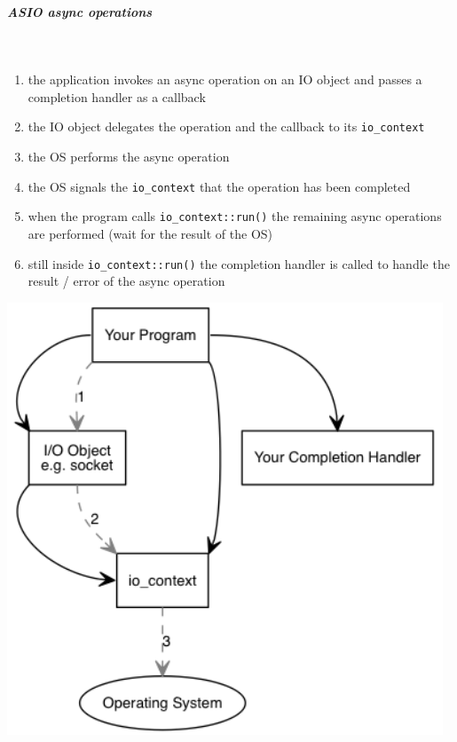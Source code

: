 \documentclass[11pt,twoside,landscape]{article}
\begin{document}
\begin{multicols}{2}
\subparagraph{ASIO async operations} \
\label{sec:org05bd540}
\begin{enumerate}
\item the application invokes an async operation on an IO object and passes a completion handler as a callback
\item the IO object delegates the operation and the callback to its \texttt{io\_context}
\item the OS performs the async operation
\item the OS signals the \texttt{io\_context} that the operation has been completed
\item when the program calls \texttt{io\_context::run()} the remaining async operations are performed (wait for the result of the OS)
\item still inside \texttt{io\_context::run()} the completion handler is called to handle the result / error of the async operation
\end{enumerate}


{
\begin{center}
\includegraphics[width=.9\linewidth]{img/asio_async_operation.png}
\end{center}
\label{fig:asio-async-operations-part-1}
}


\end{multicols}
\end{document}
